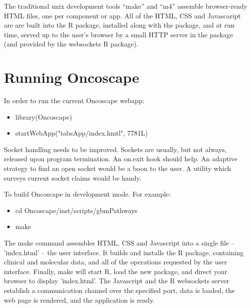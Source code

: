 \documentclass{article}
\begin{document}
The traditional unix development tools ``make'' and ``m4'' assemble browser-ready HTML files, one per component or app. 
All of the HTML, CSS and Javascaript are  are built into the R package, installed along with the package, and at run time,
served up to the user's browser by a small HTTP server in the package (and provided by the websockets R package).

\section{Running Oncoscape}

In order to run the current Oncoscape webapp:

\begin{itemize}
   \item library(Oncoscape)
   \item startWebApp("tabsApp/index.hmtl", 7781L)
\end{itemize}

Socket handling needs to be improved.  Sockets are usually, but not always, released upon program termination.  An on.exit hook should help.
An adaptive strategy to find an open socket would be a boon to the user.  A utility which surveys current socket claims would be handy.

To build Oncoscape in development mode.  For example:

\begin{itemize}
  \item cd Oncoscape/inst/scripts/gbmPathways 
  \item make
\end{itemize}

The make command assembles HTML, CSS and Javascript into a single file -- 'index.html' -- the user interface.  
It builds and installs the R package, containing clinical and molecular data, and all of the operations
requested by the user interface.   Finally, make will start R, load the new package, and direct
your browser to display 'index.html'.   The Javascript and the R websockets server establish a communication 
channel over the specified port, data is loaded, the web page is rendered, and the application is ready.
\end{document}
